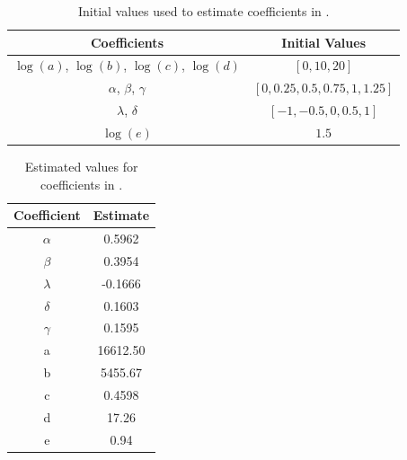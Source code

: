 \begin{table}[h]
    \centering
    \caption{Initial values used to estimate coefficients in .}
    \begin{tabular}{c | c}
    \toprule
    Coefficients & Initial Values \\
    \midrule
    $\log(a)$, $\log(b)$, $\log(c)$, $\log(d)$ & $\left[0, 10, 20 \right]$ \\
    $\alpha$, $\beta$, $\gamma$ & $\left[ 0, 0.25, 0.5, 0.75, 1, 1.25\right]$ \\ 
    $\lambda$, $\delta$ & $\left[ -1, -0.5, 0, 0.5, 1\right]$\\
    $\log(e)$ & $1.5$  \\
    \bottomrule
    \end{tabular}
\label{tab:lbfgs:hparams}
\end{table}

\begin{table}[h]
    \centering
    \caption{Estimated values for coefficients in .}
    \begin{tabular}{c | c}
    \toprule
    Coefficient & Estimate \\
    \midrule
    $\alpha$ & 0.5962 \\
    $\beta$ & 0.3954 \\
    $\lambda$ & -0.1666 \\
    $\delta$ & 0.1603\\
    $\gamma$ & 0.1595 \\
    a & 16612.50 \\
    b & 5455.67 \\
    c & 0.4598 \\
    d & 17.26 \\
    e & 0.94 \\    
    \bottomrule
    \end{tabular}
\label{tab:lbfgs:estimate_params}
\end{table}